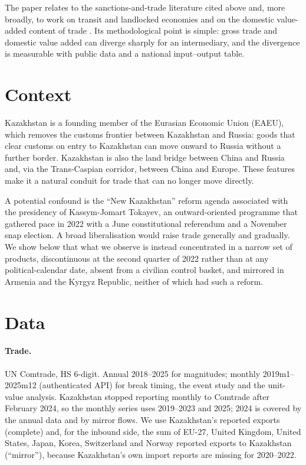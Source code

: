 \documentclass[12pt]{article}
\begin{document}
The paper relates to the sanctions-and-trade literature cited above and, more broadly, to
work on transit and landlocked economies and on the domestic value-added content of trade
\citep{koopman2014tracing,los2016tracing}. Its methodological point is simple: gross trade and
domestic value added can diverge sharply for an intermediary, and the divergence is
measurable with public data and a national input--output table.

\section{Context}

Kazakhstan is a founding member of the Eurasian Economic Union (EAEU), which removes the
customs frontier between Kazakhstan and Russia: goods that clear customs on entry to
Kazakhstan can move onward to Russia without a further border. Kazakhstan is also the land
bridge between China and Russia and, via the Trans-Caspian corridor, between China and Europe.
These features make it a natural conduit for trade that can no longer move directly.

A potential confound is the ``New Kazakhstan'' reform agenda associated with the presidency of
Kassym-Jomart Tokayev, an outward-oriented programme that gathered pace in 2022 with a June
constitutional referendum and a November snap election. A broad liberalisation would raise
trade generally and gradually. We show below that what we observe is instead concentrated in a
narrow set of products, discontinuous at the second quarter of 2022 rather than at any
political-calendar date, absent from a civilian control basket, and mirrored in Armenia and
the Kyrgyz Republic, neither of which had such a reform.

\section{Data}

\paragraph{Trade.} UN Comtrade, HS 6-digit. Annual 2018--2025 for magnitudes; monthly
2019m1--2025m12 (authenticated API) for break timing, the event study and the unit-value
analysis. Kazakhstan stopped reporting monthly to Comtrade after February 2024, so the monthly
series uses 2019--2023 and 2025; 2024 is covered by the annual data and by mirror flows.
We use Kazakhstan's reported exports (complete) and, for the inbound side, the sum of
EU-27, United Kingdom, United States, Japan, Korea, Switzerland and Norway reported exports to
Kazakhstan (``mirror''), because Kazakhstan's own import reports are missing for 2020--2022.
\end{document}

